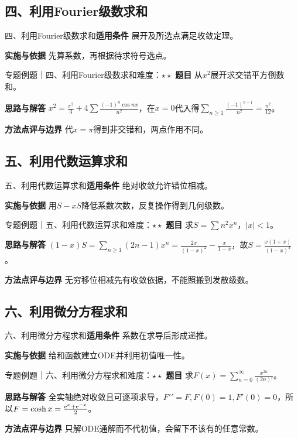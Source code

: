 \subsection{四、利用Fourier级数求和}\label{mat:series_sum8:j4}
\begin{method}{四、利用Fourier级数求和}\textbf{适用条件} 展开及所选点满足收敛定理。\par\textbf{实施与依据} 先算系数，再根据待求符号选点。\end{method}
\begin{example}{专题例题｜四、利用Fourier级数求和}{难度：$\star\star$}
\textbf{题目} 从$x^2$展开求交错平方倒数和。\par\textbf{思路与解答} $x^2=\frac{\pi^2}{3}+4\sum\frac{(-1)^n\cos nx}{n^2}$，在$x=0$代入得$\sum_{n\ge1}\frac{(-1)^{n-1}}{n^2}=\frac{\pi^2}{12}$。\par\textbf{方法点评与边界} 代$x=\pi$得到非交错和，两点作用不同。
\end{example}
\subsection{五、利用代数运算求和}\label{mat:series_sum8:j5}
\begin{method}{五、利用代数运算求和}\textbf{适用条件} 绝对收敛允许错位相减。\par\textbf{实施与依据} 用$S-xS$降低系数次数，反复操作得到几何级数。\end{method}
\begin{example}{专题例题｜五、利用代数运算求和}{难度：$\star\star$}
\textbf{题目} 求$S=\sum n^2x^n$，$|x|<1$。\par\textbf{思路与解答} $(1-x)S=\sum_{n\ge1}(2n-1)x^n=\frac{2x}{(1-x)^2}-\frac{x}{1-x}$，故$S=\frac{x(1+x)}{(1-x)^3}$。\par\textbf{方法点评与边界} 无穷移位相减先有收敛依据，不能照搬到发散级数。
\end{example}
\subsection{六、利用微分方程求和}\label{mat:series_sum8:j6}
\begin{method}{六、利用微分方程求和}\textbf{适用条件} 系数在求导后形成递推。\par\textbf{实施与依据} 给和函数建立ODE并利用初值唯一性。\end{method}
\begin{example}{专题例题｜六、利用微分方程求和}{难度：$\star\star$}
\textbf{题目} 求$F(x)=\sum_{n=0}^\infty \frac{x^{2n}}{(2n)!}$。\par\textbf{思路与解答} 全实轴绝对收敛且可逐项求导，$F\prime\prime=F,F(0)=1,F\prime(0)=0$，所以$F=\cosh x=\frac{\mathrm{e}^x+\mathrm{e}^{-x}}{2}$。\par\textbf{方法点评与边界} 只解ODE通解而不代初值，会留下不该有的任意常数。
\end{example}
